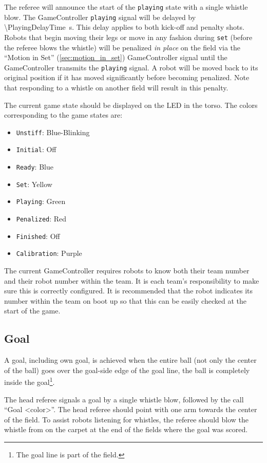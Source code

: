 The referee will announce the start of the \texttt{playing} state with a single whistle blow.
The GameController \texttt{playing} signal will be delayed by \qty{\PlayingDelayTime}{\second}.
This delay applies to both kick-off and penalty shots.
Robots that begin moving their legs or move in any fashion during \texttt{set} (\ie before the referee blows the whistle) will be penalized \textit{in place} on the field via the ``Motion in Set'' (\cf \cref{sec:motion_in_set}) GameController signal until the GameController transmits the \texttt{playing} signal. A robot will be moved back to its original position if it has moved significantly before becoming penalized.
Note that responding to a whistle on another field will result in this penalty.

The current game state should be displayed on the LED in the torso. The colors corresponding to the game states are:

\begin{itemize}
  \item \texttt{Unstiff}: Blue-Blinking
  \item \texttt{Initial}: Off
  \item \texttt{Ready}: Blue
  \item \texttt{Set}: Yellow
  \item \texttt{Playing}: Green
  \item \texttt{Penalized}: Red
  \item \texttt{Finished}: Off
  \item \texttt{Calibration}: Purple
\end{itemize}

The current GameController requires robots to know both their team number and their robot number within the team. It is each team's responsibility to make sure this is correctly configured. It is recommended that the robot indicates its number within the team on boot up so that this can be easily checked at the start of the game.

\subsection{Goal}
\label{sec:goal}
A goal, including own goal, is achieved when the entire ball (not only the center of the ball) goes over the goal-side edge of the goal line, \ie the ball is completely inside the goal\footnote{The goal line is part of the field.}.

The head referee signals a goal by a single whistle blow, followed by the call ``Goal \textless color\textgreater''.
The head referee should point with one arm towards the center of the field.
To assist robots listening for whistles, the referee should blow the whistle from on the carpet at the end of the fields where the goal was scored.

